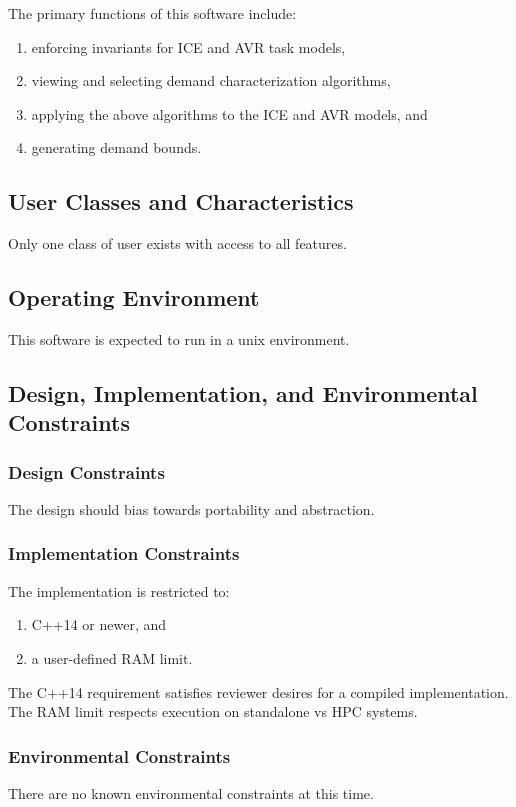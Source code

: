 \documentclass[12pt,a4paper]{article}
\begin{document}
The primary functions of this software include:
\begin{enumerate}
    \item enforcing invariants for ICE and AVR task models,
    \item viewing and selecting demand characterization algorithms,
    \item applying the above algorithms to the ICE and AVR models, and
    \item generating demand bounds.
\end{enumerate}

\subsection{User Classes and Characteristics}

Only one class of user exists with access to all features.

\subsection{Operating Environment}

This software is expected to run in a unix environment.

\subsection{Design, Implementation, and Environmental Constraints}

\subsubsection{Design Constraints}
The design should bias towards portability and abstraction.

\subsubsection{Implementation Constraints}
The implementation is restricted to:
\begin{enumerate}
    \item C++14 or newer, and
    \item a user-defined RAM limit.
\end{enumerate}
The C++14 requirement satisfies reviewer desires for a compiled implementation.
The RAM limit respects execution on standalone vs HPC systems.
\subsubsection{Environmental Constraints}
There are no known environmental constraints at this time.
\end{document}
